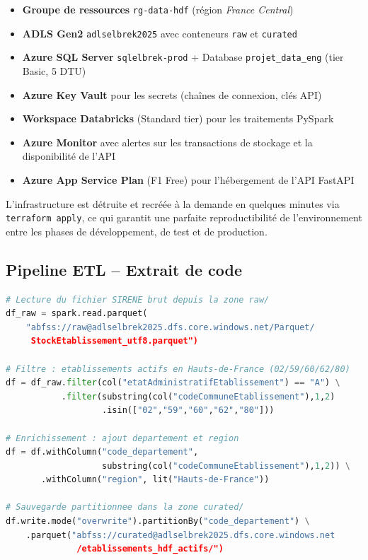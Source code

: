 \documentclass[11pt,a4paper]{article}
\begin{document}
\begin{itemize}
  \item \textbf{Groupe de ressources} \texttt{rg-data-hdf} (région \textit{France Central})
  \item \textbf{ADLS Gen2} \texttt{adlselbrek2025} avec conteneurs \texttt{raw} et \texttt{curated}
  \item \textbf{Azure SQL Server} \texttt{sqlelbrek-prod} + Database \texttt{projet\_data\_eng} (tier Basic, 5 DTU)
  \item \textbf{Azure Key Vault} pour les secrets (chaînes de connexion, clés API)
  \item \textbf{Workspace Databricks} (Standard tier) pour les traitements PySpark
  \item \textbf{Azure Monitor} avec alertes sur les transactions de stockage et la disponibilité de l'API
  \item \textbf{Azure App Service Plan} (F1 Free) pour l'hébergement de l'API FastAPI
\end{itemize}

L'infrastructure est détruite et recréée à la demande en quelques minutes via \texttt{terraform apply},
ce qui garantit une parfaite reproductibilité de l'environnement entre les phases de développement,
de test et de production.

\subsection{Pipeline ETL -- Extrait de code}

\begin{lstlisting}[language=Python, caption=Extrait -- Filtrage SIRENE Hauts-de-France (PySpark / Databricks)]
# Lecture du fichier SIRENE brut depuis la zone raw/
df_raw = spark.read.parquet(
    "abfss://raw@adlselbrek2025.dfs.core.windows.net/Parquet/
     StockEtablissement_utf8.parquet")

# Filtre : etablissements actifs en Hauts-de-France (02/59/60/62/80)
df = df_raw.filter(col("etatAdministratifEtablissement") == "A") \
           .filter(substring(col("codeCommuneEtablissement"),1,2)
                   .isin(["02","59","60","62","80"]))

# Enrichissement : ajout departement et region
df = df.withColumn("code_departement",
                   substring(col("codeCommuneEtablissement"),1,2)) \
       .withColumn("region", lit("Hauts-de-France"))

# Sauvegarde partitionnee dans la zone curated/
df.write.mode("overwrite").partitionBy("code_departement") \
    .parquet("abfss://curated@adlselbrek2025.dfs.core.windows.net
              /etablissements_hdf_actifs/")
\end{lstlisting}
\end{document}
